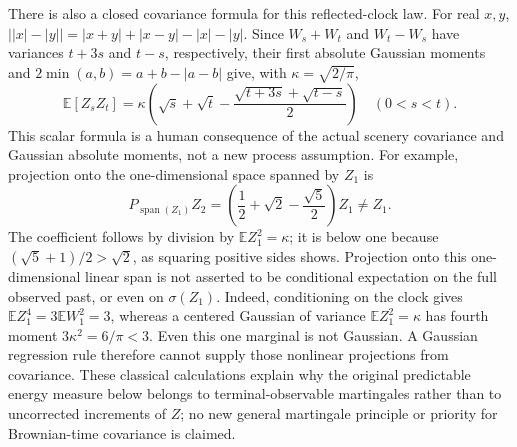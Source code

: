 \documentclass[11pt]{article}
\theoremstyle{remark}\newtheorem{remark}[theorem]{Remark}
\newcommand{\E}{\mathbb E}
\begin{document}
There is also a closed covariance formula for this reflected-clock law.
For real $x,y$, $\bigl||x|-|y|\bigr|
=|x+y|+|x-y|-|x|-|y|$. Since $W_s+W_t$ and $W_t-W_s$ have variances
$t+3s$ and $t-s$, respectively, their first absolute Gaussian moments
and $2\min(a,b)=a+b-|a-b|$ give, with $\kappa=\sqrt{2/\pi}$,
\[
 \E[Z_sZ_t]=\kappa\left(\sqrt s+\sqrt t
             -\frac{\sqrt{t+3s}+\sqrt{t-s}}2\right)
                    \quad(0<s<t).
\]
This scalar formula is a human consequence of the actual scenery
covariance and Gaussian absolute moments, not a new process assumption.
For example, projection onto the one-dimensional space spanned by $Z_1$
is
\[
 P_{\operatorname{span}(Z_1)}Z_2
   =\left(\frac12+\sqrt2-\frac{\sqrt5}{2}\right)Z_1\ne Z_1.
\]
The coefficient follows by division by $\E Z_1^2=\kappa$; it is below
one because $(\sqrt5+1)/2>\sqrt2$, as squaring positive sides shows.
Projection onto this one-dimensional linear span is not asserted to be
conditional expectation on the full observed past, or even on
$\sigma(Z_1)$. Indeed, conditioning on the clock gives $\E Z_1^4=3\E W_1^2=3$,
whereas a centered Gaussian of variance $\E Z_1^2=\kappa$ has fourth
moment $3\kappa^2=6/\pi<3$. Even this one marginal is not Gaussian.
A Gaussian regression rule therefore cannot supply those nonlinear
projections from covariance.
These classical calculations explain why the original predictable energy
measure below belongs to terminal-observable martingales rather than to
uncorrected increments of $Z$; no new general martingale principle or
priority for Brownian-time covariance is claimed.
\end{document}
